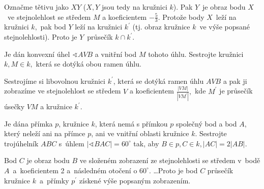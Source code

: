 \begin{reseni}
Označme tětivu jako $XY$ ($X,Y$ jsou tedy na kružnici $k$). Pak $Y$~je obraz
bodu $X$~ve stejnolehlost se středem $M$ a koeficientem $-\frac{5}{3}$. Protože
body $X$~leží na kružnici $k,$ pak bod $Y$ leží na kružnici $k^\prime$ (tj. obraz
kružnice $k$~ve výše popsané stejnolehlosti). Proto je $Y$~průsečík $k\cap k^\prime$.
\end{reseni}

\begin{priklad}
Je dán konvexní úhel $\sphericalangle AVB$ a vnitřní bod $M$ tohoto úhlu. Sestrojte kružnici $k,M\in k,$
která se dotýká obou ramen úhlu.
\end{priklad}

\begin{reseni}
Sestrojíme si libovolnou kružnici $k^\prime$, která se dotýká ramen úhlu $AVB$ a pak
ji zobrazíme ve stejnolehlost se středem $V$ a koeficientem $\frac{|VM|}{|VM^\prime|},$
kde $M^\prime$ je průsečík úsečky $VM$ a kružnice $k^\prime$.
\end{reseni}

\begin{priklad}
Je dána přímka $p$, kružnice $k$, která nemá s přímkou $p$ společný bod a bod $A$, který
neleží ani na přímce $p$, ani ve vnitřní oblasti kružnice $k$. Sestrojte trojúhelník
$ABC$ s~úhlem $|\sphericalangle BAC|=60^\circ$ tak, aby $B\in p, C \in k, |AC|=2|AB|.$
\end{priklad}

\begin{reseni}
Bod $C$ je obraz bodu $B$ ve složeném zobrazení ze stejnolehlosti se středem v~bodě
$A$~a~koeficientem 2 a~následném otočení o $60^\circ.$ \dots Proto je bod $C$ průsečík
kružnice $k$~a~přímky $p^\prime$ získené výše popsaným zobrazením.
\end{reseni}
